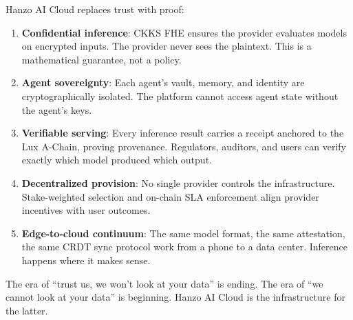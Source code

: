 \documentclass[11pt]{article}
\begin{document}
Hanzo AI Cloud replaces trust with proof:

\begin{enumerate}[leftmargin=1.4em]
    \item \textbf{Confidential inference}: CKKS FHE ensures the provider
    evaluates models on encrypted inputs. The provider never sees the
    plaintext. This is a mathematical guarantee, not a policy.
    \item \textbf{Agent sovereignty}: Each agent's vault, memory, and identity
    are cryptographically isolated. The platform cannot access agent state
    without the agent's keys.
    \item \textbf{Verifiable serving}: Every inference result carries a
    receipt anchored to the Lux A-Chain, proving provenance. Regulators,
    auditors, and users can verify exactly which model produced which output.
    \item \textbf{Decentralized provision}: No single provider controls the
    infrastructure. Stake-weighted selection and on-chain SLA enforcement
    align provider incentives with user outcomes.
    \item \textbf{Edge-to-cloud continuum}: The same model format, the same
    attestation, the same CRDT sync protocol work from a phone to a data
    center. Inference happens where it makes sense.
\end{enumerate}

The era of ``trust us, we won't look at your data'' is ending. The era of
``we cannot look at your data'' is beginning. Hanzo AI Cloud is the
infrastructure for the latter.
\end{document}
